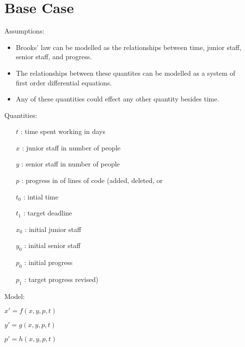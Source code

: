 \documentclass{article}
\newenvironment{atomize}
    {\begin{list} {} {
            \setlength\itemindent{0pt}
            \setlength\leftmargin{10pt}
            \setlength\labelwidth{0pt}
    }}
    {\end{list}}
\begin{document}
\section*{Base Case}
    \begin{atomize}
        \item Assumptions:
            \begin{itemize}
								\item Brooks' law can be modelled as the relationships between
								time, junior staff, senior staff, and progress.
								\item The relationships between these quantites can be modelled
								as a system of first order differential equations.
								\item Any of these quantities could effect any other quantity
								besides time.  
								\end{itemize}
        \item Quantities:
            \begin{itemize}
                \item [$t$]: time spent working in days
                \item [$x$]: junior staff in number of people
                \item [$y$]: senior staff in number of people
                \item [$p$]: progress in of lines of code (added, deleted, or
								\item [$t_{0}$]: intial time
								\item [$t_{1}$]: target deadline
								\item [$x_{0}$]: initial junior staff
								\item [$y_{0}$]: initial senior staff
								\item [$p_{0}$]: initial progress
								\item [$p_{1}$]: target progress
								revised)
            \end{itemize}
        \item Model:
            \begin{atomize}
                \item $x\prime = f\left(x, y, p, t\right)$
                \item $y\prime = g\left(x, y, p, t\right)$
                \item $p\prime = h\left(x, y, p, t\right)$
            \end{atomize}
    \end{atomize}
\end{document}
